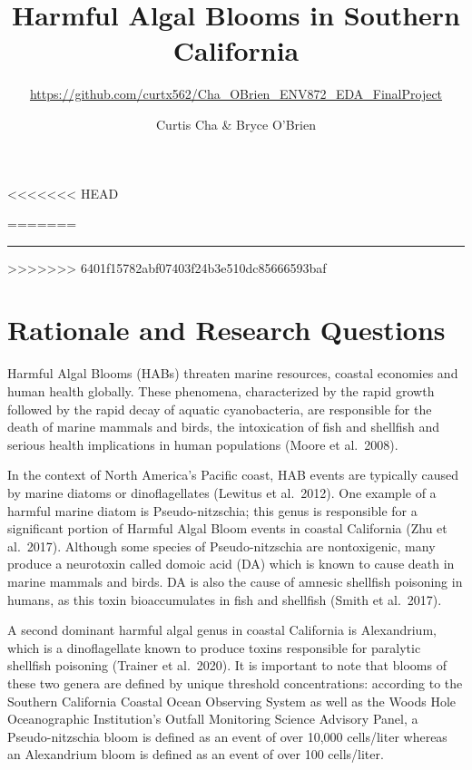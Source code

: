 \documentclass[
  12pt,
]{article}
\title{Harmful Algal Blooms in Southern California}
\subtitle{\url{https://github.com/curtx562/Cha_OBrien_ENV872_EDA_FinalProject}}
\author{Curtis Cha \& Bryce O'Brien}
\date{}
\begin{document}
\maketitle

\newpage
<<<<<<< HEAD
\tableofcontents 
\newpage
\listoftables 
\newpage
\listoffigures 
\newpage
=======
\tableofcontents
\newpage
\listoftables 
\newpage
\listoffigures
\newpage

\begin{center}\rule{0.5\linewidth}{0.5pt}\end{center}
>>>>>>> 6401f15782abf07403f24b3e510dc85666593baf

\hypertarget{rationale-and-research-questions}{%
\section{Rationale and Research
Questions}\label{rationale-and-research-questions}}

Harmful Algal Blooms (HABs) threaten marine resources, coastal economies
and human health globally. These phenomena, characterized by the rapid
growth followed by the rapid decay of aquatic cyanobacteria, are
responsible for the death of marine mammals and birds, the intoxication
of fish and shellfish and serious health implications in human
populations (Moore et al.~2008).

In the context of North America's Pacific coast, HAB events are
typically caused by marine diatoms or dinoflagellates (Lewitus et
al.~2012). One example of a harmful marine diatom is Pseudo-nitzschia;
this genus is responsible for a significant portion of Harmful Algal
Bloom events in coastal California (Zhu et al.~2017). Although some
species of Pseudo-nitzschia are nontoxigenic, many produce a neurotoxin
called domoic acid (DA) which is known to cause death in marine mammals
and birds. DA is also the cause of amnesic shellfish poisoning in
humans, as this toxin bioaccumulates in fish and shellfish (Smith et
al.~2017).

A second dominant harmful algal genus in coastal California is
Alexandrium, which is a dinoflagellate known to produce toxins
responsible for paralytic shellfish poisoning (Trainer et al.~2020). It
is important to note that blooms of these two genera are defined by
unique threshold concentrations: according to the Southern California
Coastal Ocean Observing System as well as the Woods Hole Oceanographic
Institution's Outfall Monitoring Science Advisory Panel, a
Pseudo-nitzschia bloom is defined as an event of over 10,000 cells/liter
whereas an Alexandrium bloom is defined as an event of over 100
cells/liter.
\end{document}

